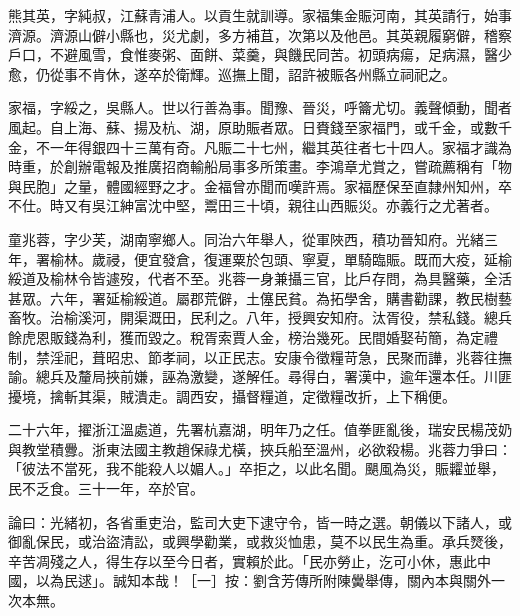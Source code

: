\begin{pinyinscope}
熊其英，字純叔，江蘇青浦人。以貢生就訓導。家福集金賑河南，其英請行，始事濟源。濟源山僻小縣也，災尤劇，多方補苴，次第以及他邑。其英親履窮僻，稽察戶口，不避風雪，食惟麥粥、面餅、菜羹，與饑民同苦。初頭病瘍，足病濕，醫少愈，仍從事不肯休，遂卒於衛輝。巡撫上聞，詔許被賑各州縣立祠祀之。

家福，字綏之，吳縣人。世以行善為事。聞豫、晉災，呼籥尤切。義聲傾動，聞者風起。自上海、蘇、揚及杭、湖，原助賑者眾。日賚錢至家福門，或千金，或數千金，不一年得銀四十三萬有奇。凡賑二十七州，繼其英往者七十四人。家福才識為時重，於創辦電報及推廣招商輸船局事多所策畫。李鴻章尤賞之，嘗疏薦稱有「物與民胞」之量，體國經野之才。金福曾亦聞而嘆許焉。家福歷保至直隸州知州，卒不仕。時又有吳江紳富沈中堅，鬻田三十頃，親往山西賑災。亦義行之尤著者。

童兆蓉，字少芙，湖南寧鄉人。同治六年舉人，從軍陜西，積功晉知府。光緒三年，署榆林。歲祲，便宜發倉，復運粟於包頭、寧夏，單騎臨賑。既而大疫，延榆綏道及榆林令皆遽歿，代者不至。兆蓉一身兼攝三官，比戶存問，為具醫藥，全活甚眾。六年，署延榆綏道。屬郡荒僻，土僿民貧。為拓學舍，購書勸課，教民樹藝畜牧。治榆溪河，開渠溉田，民利之。八年，授興安知府。汰胥役，禁私錢。總兵餘虎恩販錢為利，獲而毀之。稅胥索賈人金，榜治幾死。民間婚娶茍簡，為定禮制，禁淫祀，葺昭忠、節孝祠，以正民志。安康令徵糧苛急，民聚而譁，兆蓉往撫諭。總兵及釐局挾前嫌，誣為激變，遂解任。尋得白，署漢中，逾年還本任。川匪擾境，擒斬其渠，賊潰走。調西安，攝督糧道，定徵糧改折，上下稱便。

二十六年，擢浙江溫處道，先署杭嘉湖，明年乃之任。值拳匪亂後，瑞安民楊茂奶與教堂積釁。浙東法國主教趙保祿尤橫，挾兵船至溫州，必欲殺楊。兆蓉力爭曰：「彼法不當死，我不能殺人以媚人。」卒拒之，以此名聞。颶風為災，賑糶並舉，民不乏食。三十一年，卒於官。

論曰：光緒初，各省重吏治，監司大吏下逮守令，皆一時之選。朝儀以下諸人，或御亂保民，或治盜清訟，或興學勸業，或救災恤患，莫不以民生為重。承兵燹後，辛苦凋殘之人，得生存以至今日者，實賴於此。「民亦勞止，汔可小休，惠此中國，以為民逑」。誠知本哉！［一］按：劉含芳傳所附陳黌舉傳，關內本與關外一次本無。


\end{pinyinscope}